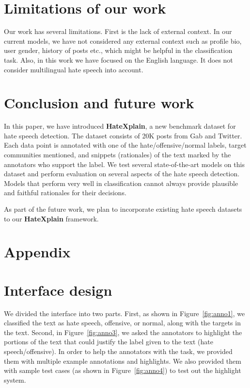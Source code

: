 \documentclass[letterpaper]{article} \usepackage{aaai21}  \usepackage{times}  \usepackage{helvet} \usepackage{courier}  \usepackage[hyphens]{url}  \usepackage{graphicx} \urlstyle{rm} \def\UrlFont{\rm}  \usepackage{natbib}  \usepackage{caption}
\begin{document}
\section{Limitations of our work}
Our work has several limitations. First is the lack of external context. In our current models, we have not considered any external context such as profile bio, user gender, history of posts etc., which might be helpful in the classification task. Also, in this work we have focused on the English language. It does not consider multilingual hate speech into account.


\section{Conclusion and future work}
In this paper, we have introduced {\bf{HateXplain}}, a new benchmark dataset for hate speech detection. The dataset consists of 20K posts from Gab and Twitter. Each data point is annotated with one of the hate/offensive/normal labels, target communities mentioned, and snippets (rationales) of the text marked by the annotators who support the label. We test several state-of-the-art models on this dataset and perform evaluation on several aspects of the hate speech detection. Models that perform very well in classification cannot always provide plausible and faithful rationales for their decisions. 

As part of the future work, we plan to incorporate existing hate speech datasets~\cite{davidson2017automated,ousidhoum2019multilingual,founta2018large} to our {\bf{HateXplain}} framework. 





\section{Appendix}



\section{Interface design}

We divided the interface into two parts. First, as shown in Figure~\ref{fig:anno1}, we classified the text as hate speech, offensive, or normal, along with the targets in the text. Second, in Figure~\ref{fig:anno3}, we asked the annotators to highlight the portions of the text that could justify the label given to the text (hate speech/offensive). In order to help the annotators with the task, we provided them with multiple example annotations and highlights. We also provided them with sample test cases (as shown in Figure~\ref{fig:anno4}) to test out the highlight system.
\end{document}
